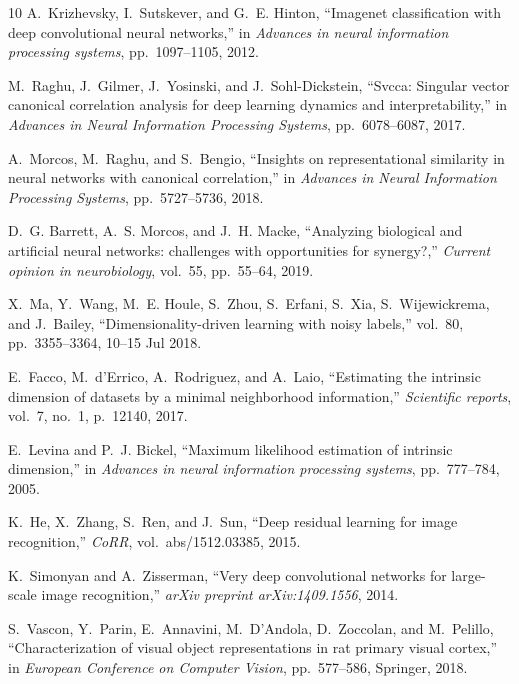 \documentclass{article}
\begin{document}
\begin{thebibliography}{10}
A.~Krizhevsky, I.~Sutskever, and G.~E. Hinton, ``Imagenet classification with
  deep convolutional neural networks,'' in {\em Advances in neural information
  processing systems}, pp.~1097--1105, 2012.

M.~Raghu, J.~Gilmer, J.~Yosinski, and J.~Sohl-Dickstein, ``Svcca: Singular
  vector canonical correlation analysis for deep learning dynamics and
  interpretability,'' in {\em Advances in Neural Information Processing
  Systems}, pp.~6078--6087, 2017.

A.~Morcos, M.~Raghu, and S.~Bengio, ``Insights on representational similarity
  in neural networks with canonical correlation,'' in {\em Advances in Neural
  Information Processing Systems}, pp.~5727--5736, 2018.

D.~G. Barrett, A.~S. Morcos, and J.~H. Macke, ``Analyzing biological and
  artificial neural networks: challenges with opportunities for synergy?,''
  {\em Current opinion in neurobiology}, vol.~55, pp.~55--64, 2019.

X.~Ma, Y.~Wang, M.~E. Houle, S.~Zhou, S.~Erfani, S.~Xia, S.~Wijewickrema, and
  J.~Bailey, ``Dimensionality-driven learning with noisy labels,'' vol.~80,
  pp.~3355--3364, 10--15 Jul 2018.

E.~Facco, M.~d'Errico, A.~Rodriguez, and A.~Laio, ``Estimating the intrinsic
  dimension of datasets by a minimal neighborhood information,'' {\em
  Scientific reports}, vol.~7, no.~1, p.~12140, 2017.

E.~Levina and P.~J. Bickel, ``Maximum likelihood estimation of intrinsic
  dimension,'' in {\em Advances in neural information processing systems},
  pp.~777--784, 2005.

K.~He, X.~Zhang, S.~Ren, and J.~Sun, ``Deep residual learning for image
  recognition,'' {\em CoRR}, vol.~abs/1512.03385, 2015.

K.~Simonyan and A.~Zisserman, ``Very deep convolutional networks for
  large-scale image recognition,'' {\em arXiv preprint arXiv:1409.1556}, 2014.

S.~Vascon, Y.~Parin, E.~Annavini, M.~D'Andola, D.~Zoccolan, and M.~Pelillo,
  ``Characterization of visual object representations in rat primary visual
  cortex,'' in {\em European Conference on Computer Vision}, pp.~577--586,
  Springer, 2018.


\end{thebibliography}
\end{document}
